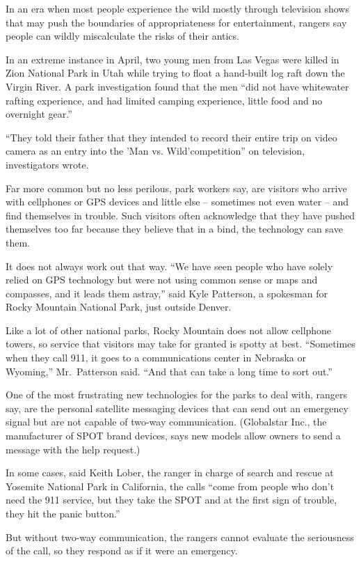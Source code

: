 ﻿\documentclass[12pt]{article}
\begin{document}
In an era when most people experience the wild mostly through television shows that may push the
boundaries of appropriateness for entertainment, rangers say people can wildly miscalculate the
risks of their antics.

In an extreme instance in April, two young men from Las Vegas were killed in Zion National Park in
Utah while trying to float a hand-built log raft down the Virgin River. A park investigation found
that the men ``did not have whitewater rafting experience, and had limited camping experience,
little food and no overnight gear.''

``They told their father that they intended to record their entire trip on video camera as an entry
into the 'Man vs. Wild'competition'' on television, investigators wrote.

Far more common but no less perilous, park workers say, are visitors who arrive with cellphones or
GPS devices and little else -- sometimes not even water -- and find themselves in trouble. Such
visitors often acknowledge that they have pushed themselves too far because they believe that in a
bind, the technology can save them.

It does not always work out that way. ``We have seen people who have solely relied on GPS technology
but were not using common sense or maps and compasses, and it leads them astray,'' said Kyle
Patterson, a spokesman for Rocky Mountain National Park, just outside Denver.

Like a lot of other national parks, Rocky Mountain does not allow cellphone towers, so service that
visitors may take for granted is spotty at best. ``Sometimes when they call 911, it goes to a
communications center in Nebraska or Wyoming,'' Mr.~Patterson said. ``And that can take a long time
to sort out.''

One of the most frustrating new technologies for the parks to deal with, rangers say, are the
personal satellite messaging devices that can send out an emergency signal but are not capable of
two-way communication. (Globalstar Inc., the manufacturer of SPOT brand devices, says new models
allow owners to send a message with the help request.)

In some cases, said Keith Lober, the ranger in charge of search and rescue at Yosemite National Park
in California, the calls ``come from people who don't need the 911 service, but they take the SPOT
and at the first sign of trouble, they hit the panic button.''

But without two-way communication, the rangers cannot evaluate the seriousness of the call, so they
respond as if it were an emergency.
\end{document}
